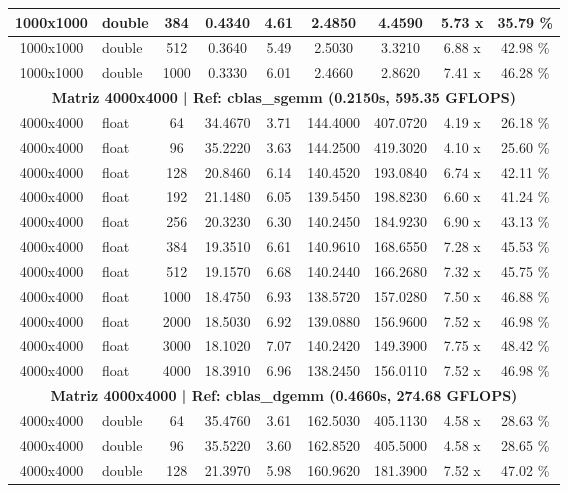 \documentclass[12pt]{article}
\begin{document}
\begin{table}[H]
\begin{tabular}{|c|l|c|c|c|c|c|c|c|}
        1000x1000 & double & 384  & 0.4340 & 4.61 & 2.4850 & 4.4590  & 5.73 x & 35.79 \% \\ \hline
        1000x1000 & double & 512  & 0.3640 & 5.49 & 2.5030 & 3.3210  & 6.88 x & 42.98 \% \\ \hline
        1000x1000 & double & 1000 & 0.3330 & 6.01 & 2.4660 & 2.8620  & 7.41 x & 46.28 \% \\ \hline
        \multicolumn{9}{|c|}{\textbf{Matriz 4000x4000 | Ref: cblas\_sgemm (0.2150s, 595.35 GFLOPS)}} \\ \hline
        4000x4000 & float & 64   & 34.4670 & 3.71 & 144.4000 & 407.0720 & 4.19 x & 26.18 \% \\ \hline
        4000x4000 & float & 96   & 35.2220 & 3.63 & 144.2500 & 419.3020 & 4.10 x & 25.60 \% \\ \hline
        4000x4000 & float & 128  & 20.8460 & 6.14 & 140.4520 & 193.0840 & 6.74 x & 42.11 \% \\ \hline
        4000x4000 & float & 192  & 21.1480 & 6.05 & 139.5450 & 198.8230 & 6.60 x & 41.24 \% \\ \hline
        4000x4000 & float & 256  & 20.3230 & 6.30 & 140.2450 & 184.9230 & 6.90 x & 43.13 \% \\ \hline
        4000x4000 & float & 384  & 19.3510 & 6.61 & 140.9610 & 168.6550 & 7.28 x & 45.53 \% \\ \hline
        4000x4000 & float & 512  & 19.1570 & 6.68 & 140.2440 & 166.2680 & 7.32 x & 45.75 \% \\ \hline
        4000x4000 & float & 1000 & 18.4750 & 6.93 & 138.5720 & 157.0280 & 7.50 x & 46.88 \% \\ \hline
        4000x4000 & float & 2000 & 18.5030 & 6.92 & 139.0880 & 156.9600 & 7.52 x & 46.98 \% \\ \hline
        4000x4000 & float & 3000 & 18.1020 & 7.07 & 140.2420 & 149.3900 & 7.75 x & 48.42 \% \\ \hline
        4000x4000 & float & 4000 & 18.3910 & 6.96 & 138.2450 & 156.0110 & 7.52 x & 46.98 \% \\ \hline
        \multicolumn{9}{|c|}{\textbf{Matriz 4000x4000 | Ref: cblas\_dgemm (0.4660s, 274.68 GFLOPS)}} \\ \hline
        4000x4000 & double & 64   & 35.4760 & 3.61 & 162.5030 & 405.1130 & 4.58 x & 28.63 \% \\ \hline
        4000x4000 & double & 96   & 35.5220 & 3.60 & 162.8520 & 405.5000 & 4.58 x & 28.65 \% \\ \hline
        4000x4000 & double & 128  & 21.3970 & 5.98 & 160.9620 & 181.3900 & 7.52 x & 47.02 \% \\ \hline

\end{tabular}
\end{table}
\end{document}
